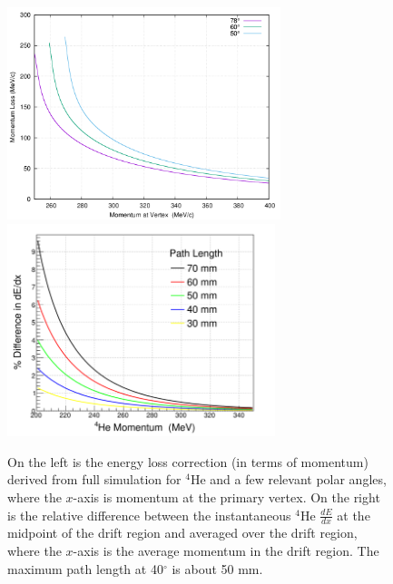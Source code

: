 \begin{figure}[tbp]
   \centering
   \includegraphics[height=6.2cm]{fig/eg6eloss_4He_rot.png}
   \includegraphics[height=6.2cm]{fig/Biasbb_alpha.png}
   \caption{On the left is the energy loss correction (in terms of momentum)
   derived from full simulation for $^4$He and a few relevant polar angles, where
   the $x$-axis is momentum at the primary vertex.  On the right is the relative
   difference between the instantaneous $^4$He $\frac{dE}{dx}$ at the midpoint of the
   drift region and averaged over the drift region, where the $x$-axis is the average
   momentum in the drift region.  The maximum path length at 40$^\circ$ is about 50 mm.}
   \label{fig:energylosscorrection}
\end{figure}


